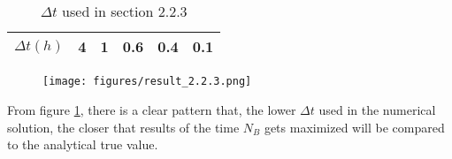 \documentclass{article}
\begin{document}
\subsection{}
\begin{table}[h]
    \centering
    \caption{\(\Delta t\) used in section 2.2.3} 
    \begin{tabular}{c c c c c c}
        \hline
        \(\Delta t(h)\)&4&1&0.6&0.4&0.1\\
        \hline
    \end{tabular}
\end{table}
\begin{figure}[h]
    \centering
    
    
    \texttt{[image: figures/result\_2.2.3.png]}
    \caption{}
    \label{1/dt}
\end{figure}
From figure \ref{1/dt}, there is a clear pattern that, the lower \(\Delta t\) used in the numerical solution, the closer that results of the time \(N_B\) gets maximized will be compared to the analytical true value.
\end{document}
